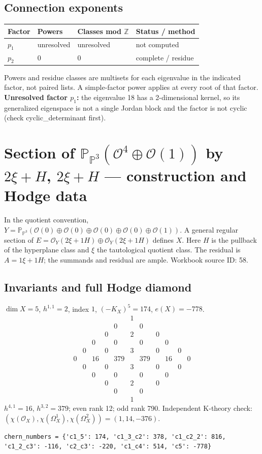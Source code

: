 \documentclass[10pt,a4paper]{article}
\begin{document}
\subsection*{Connection exponents}
\begin{center}\begin{tabular}{llll}\toprule Factor & Powers & Classes mod $\mathbb Z$ & Status / method\\\midrule
$p_{1}$ & unresolved & unresolved & not computed\\
$p_{2}$ & $0$ & $0$ & complete / residue\\
\bottomrule\end{tabular}\end{center}
Powers and residue classes are multisets for each eigenvalue in the indicated factor, not paired lists. A simple-factor power applies at every root of that factor.
\textbf{Unresolved factor $p_{1}$:} the eigenvalue 18 has a 2-dimensional kernel, so its generalized eigenspace is not a single Jordan block and the factor is not cyclic (check cyclic\_determinant first).
\clearpage\section*{Section of $\mathbb P_{\mathbb P^{3}}(\mathcal O^{4}\oplus \mathcal O(1))$ by $2\xi +H$, $2\xi +H$ --- construction and Hodge data}\label{entry:PB5-058}
In the quotient convention, $Y=\mathbb P_{\mathbb P^{3}}(\mathcal O(0)\oplus\mathcal O(0)\oplus\mathcal O(0)\oplus\mathcal O(0)\oplus\mathcal O(1))$.
A general regular section of $E=\mathcal O_Y(2\xi+1H)\oplus\mathcal O_Y(2\xi+1H)$ defines $X$.
Here $H$ is the pullback of the hyperplane class and $\xi$ the tautological quotient class. The residual is $A=1\xi+1H$; the summands and residual are ample.
Workbook source ID: 58.
\subsection*{Invariants and full Hodge diamond}
$\dim X=5$, $h^{1,1}=2$, index $1$, $(-K_X)^5=174$, $e(X)=-778$.
\[\begin{array}{ccccccccccc}&&&&&1&&&&&\\&&&&0&&0&&&&\\&&&0&&2&&0&&&\\&&0&&0&&0&&0&&\\&0&&0&&3&&0&&0&\\0&&16&&379&&379&&16&&0\\&0&&0&&3&&0&&0&\\&&0&&0&&0&&0&&\\&&&0&&2&&0&&&\\&&&&0&&0&&&&\\&&&&&1&&&&&\end{array}\]
$h^{4,1}=16$, $h^{3,2}=379$; even rank 12; odd rank 790.
Independent K-theory check: $(\chi(\mathcal O_X),\chi(\Omega_X^1),\chi(\Omega_X^2))=(1, 14, -376)$.
\begin{lstlisting}
chern_numbers = {'c1_5': 174, 'c1_3_c2': 378, 'c1_c2_2': 816, 'c1_2_c3': -116, 'c2_c3': -220, 'c1_c4': 514, 'c5': -778}
\end{lstlisting}
\end{document}
